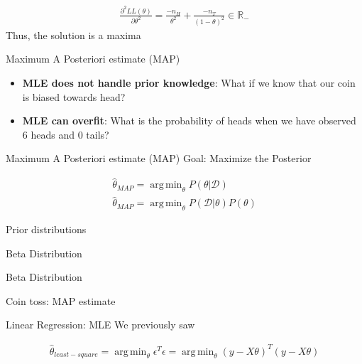 \documentclass[aspectratio=1610]{beamer}
\newcommand{\data}{\mathcal{D}}
\DeclareMathOperator*{\argmin}{arg\,min}
\begin{document}
\begin{frame}{}
\begin{align*}
\frac{\partial^2 LL(\theta)}{\partial \theta^2} = \frac{-n_H}{\theta^2} + \frac{-n_T}{(1-\theta)^2} \in \mathbb R_-
\end{align*}
Thus, the solution is a maxima
\end{frame}

\begin{frame}{Maximum A Posteriori estimate (MAP)}
\begin{itemize}


\item \textbf{MLE does not handle prior knowledge}: What if we know that our coin is biased towards head?
\item \textbf{MLE can overfit}: What is the probability of heads when we have observed 6 heads and 0 tails?
\end{itemize}

\end{frame}


\begin{frame}{Maximum A Posteriori estimate (MAP)}
Goal: Maximize the Posterior
\begin{tcolorbox}
	\begin{align}
\hat{\theta}_{MAP} = \argmin_\theta P(\theta|\data)\\
\hat{\theta}_{MAP}= \argmin_\theta P(\data|\theta)P(\theta)
\end{align}
\end{tcolorbox}

\end{frame}

\begin{frame}{Prior distributions}
\end{frame}

\begin{frame}{Beta Distribution}
\end{frame}

\begin{frame}{Beta Distribution}
\end{frame}

\begin{frame}{Coin toss: MAP estimate}
\end{frame}

\begin{frame}{Linear Regression: MLE}
We previously saw 
\begin{tcolorbox}
\begin{align*}
\hat{\theta}_{least-square} = \argmin_\theta \epsilon^T\epsilon = \argmin_\theta (y-X\theta)^T(y-X\theta)
\end{align*}
\end{tcolorbox}


\end{frame}
\end{document}
